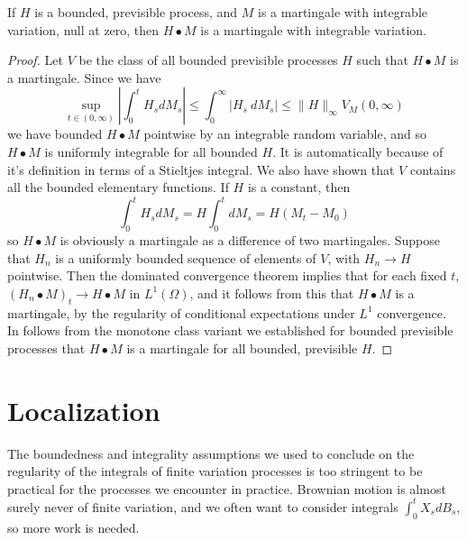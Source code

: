 \begin{theorem}
    If $H$ is a bounded, previsible process, and $M$ is a martingale with integrable variation, null at zero, then $H \bullet M$ is a martingale with integrable variation.
\end{theorem}
\begin{proof}
    Let $V$ be the class of all bounded previsible processes $H$ such that $H \bullet M$ is a martingale. Since we have
    \[ \sup_{t \in (0,\infty)} \left| \int_0^t H_s dM_s \right| \leq \int_0^\infty |H_s\ dM_s| \leq \| H \|_\infty V_M(0,\infty) \]
    we have bounded $H \bullet M$ pointwise by an integrable random variable, and so $H \bullet M$ is uniformly integrable for all bounded $H$. It is automatically because of it's definition in terms of a Stieltjes integral. We also have shown that $V$ contains all the bounded elementary functions. If $H$ is a constant, then
    \[ \int_0^t H_s dM_s = H \int_0^t dM_s = H(M_t - M_0) \]
    so $H \bullet M$ is obviously a martingale as a difference of two martingales. Suppose that $H_n$ is a uniformly bounded sequence of elements of $V$, with $H_n \to H$ pointwise. Then the dominated convergence theorem implies that for each fixed $t$, $(H_n \bullet M)_t \to H \bullet M$ in $L^1(\Omega)$, and it follows from this that $H \bullet M$ is a martingale, by the regularity of conditional expectations under $L^1$ convergence. In follows from the monotone class variant we established for bounded previsible processes that $H \bullet M$ is a martingale for all bounded, previsible $H$.
\end{proof}

\section{Localization}

The boundedness and integrality assumptions we used to conclude on the regularity of the integrals of finite variation processes is too stringent to be practical for the processes we encounter in practice. Brownian motion is almost surely never of finite variation, and we often want to consider integrals $\int_0^t X_s dB_s$, so more work is needed.

